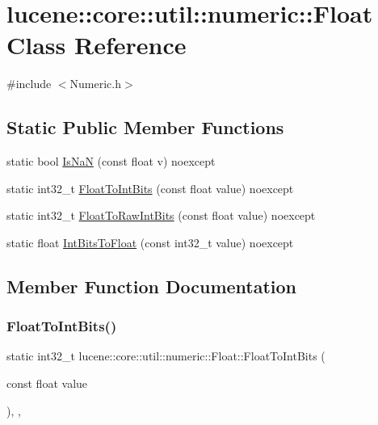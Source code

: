 \hypertarget{classlucene_1_1core_1_1util_1_1numeric_1_1Float}{}\section{lucene\+:\+:core\+:\+:util\+:\+:numeric\+:\+:Float Class Reference}
\label{classlucene_1_1core_1_1util_1_1numeric_1_1Float}


{\ttfamily \#include $<$Numeric.\+h$>$}

\subsection*{Static Public Member Functions}
\begin{DoxyCompactItemize}
\item 
static bool \mbox{\hyperlink{classlucene_1_1core_1_1util_1_1numeric_1_1Float_ae328b61754f252fe9a40c65b26162d5b}{Is\+NaN}} (const float v) noexcept
\item 
static int32\+\_\+t \mbox{\hyperlink{classlucene_1_1core_1_1util_1_1numeric_1_1Float_a31c32c03ea1cdc51385dec5a72889c62}{Float\+To\+Int\+Bits}} (const float value) noexcept
\item 
static int32\+\_\+t \mbox{\hyperlink{classlucene_1_1core_1_1util_1_1numeric_1_1Float_ac73cdb781ed72d155cacf4e8a4fa4ecb}{Float\+To\+Raw\+Int\+Bits}} (const float value) noexcept
\item 
static float \mbox{\hyperlink{classlucene_1_1core_1_1util_1_1numeric_1_1Float_aca55501557a1c47bb91659186cb7168e}{Int\+Bits\+To\+Float}} (const int32\+\_\+t value) noexcept
\end{DoxyCompactItemize}


\subsection{Member Function Documentation}
\mbox{\label{classlucene_1_1core_1_1util_1_1numeric_1_1Float_a31c32c03ea1cdc51385dec5a72889c62}} 
\subsubsection{\texorpdfstring{Float\+To\+Int\+Bits()}{FloatToIntBits()}}
{\footnotesize\ttfamily static int32\+\_\+t lucene\+::core\+::util\+::numeric\+::\+Float\+::\+Float\+To\+Int\+Bits (\begin{DoxyParamCaption}\item[{const float}]{value }\end{DoxyParamCaption})\hspace{0.3cm}{\ttfamily [inline]}, {\ttfamily [static]}, {\ttfamily [noexcept]}}

